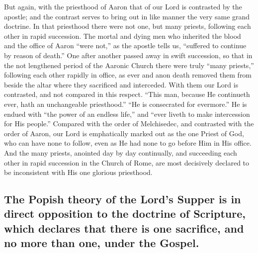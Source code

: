 \documentclass[]{book}
\begin{document}
But again, with the priesthood of Aaron that of our Lord is contrasted by the apostle; and the contrast serves to bring out in like manner the very same grand doctrine. In that priesthood there were not one, but many priests, following each other in rapid succession. The mortal and dying men who inherited the blood and the office of Aaron ``were not,'' as the apostle tells us, ``suffered to continue by reason of death.'' One after another passed away in swift succession, so that in the not lengthened period of the Aaronic Church there were truly ``many priests,'' following each other rapidly in office, as ever and anon death removed them from beside the altar where they sacrificed and interceded. With them our Lord is contrasted, and not compared in this respect. ``This man, because He continueth ever, hath an unchangeable priesthood.'' ``He is consecrated for evermore.'' He is endued with ``the power of an endless life,'' and ``ever liveth to make intercession for His people.'' Compared with the order of Melchisedec, and contrasted with the order of Aaron, our Lord is emphatically marked out as the one Priest of God, who can have none to follow, even as He had none to go before Him in His office. And the many priests, anointed day by day continually, and succeeding each other in rapid succession in the Church of Rome, are most decisively declared to be inconsistent with His one glorious priesthood.

\hypertarget{the-popish-theory-of-the-lords-supper-is-in-direct-opposition-to-the-doctrine-of-scripture-which-declares-that-there-is-one-sacrifice-and-no-more-than-one-under-the-gospel.}{%
\subsection{The Popish theory of the Lord's Supper is in direct opposition to the doctrine of Scripture, which declares that there is one sacrifice, and no more than one, under the Gospel.}\label{the-popish-theory-of-the-lords-supper-is-in-direct-opposition-to-the-doctrine-of-scripture-which-declares-that-there-is-one-sacrifice-and-no-more-than-one-under-the-gospel.}}
\end{document}
